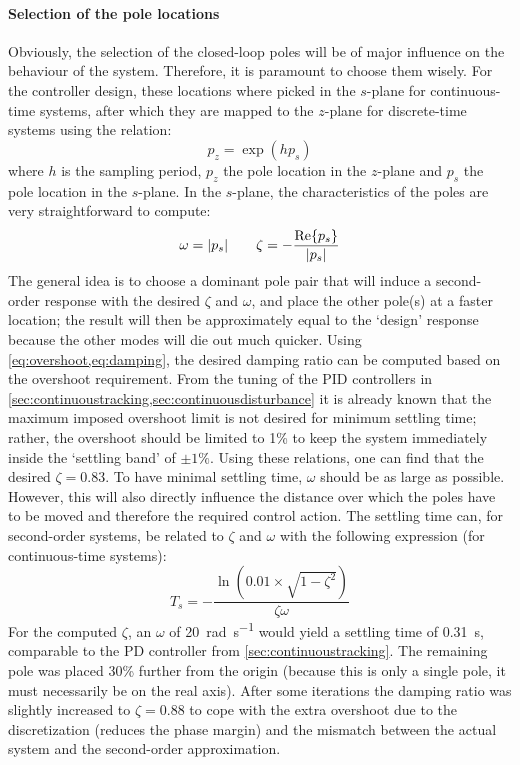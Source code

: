 \paragraph{Selection of the pole locations} Obviously, the selection of the closed-loop poles will be of major influence on the behaviour of the system. Therefore, it is paramount to choose them wisely. For the controller design, these locations where picked in the $s$-plane for continuous-time systems, after which they are mapped to the $z$-plane for discrete-time systems using the relation:
\begin{equation}
    p_z = \exp(h p_s) 
    \label{eq:polemapping}
\end{equation}
where $h$ is the sampling period, $p_z$ the pole location in the $z$-plane and $p_s$ the pole location in the $s$-plane. In the $s$-plane, the characteristics of the poles are very straightforward to compute:
$$ \omega = \abs{p_s} \qquad \zeta = -\frac{\Re{p_s}}{\abs{p_s}}$$
The general idea is to choose a dominant pole pair that will induce a second-order response with the desired $\zeta$ and $\omega$, and place the other pole(s) at a faster location; the result will then be approximately equal to the `design' response because the other modes will die out much quicker.
Using \cref{eq:overshoot,eq:damping}, the desired damping ratio can be computed based on the overshoot requirement. From the tuning of the PID controllers in \cref{sec:continuoustracking,sec:continuousdisturbance} it is already known that the maximum imposed overshoot limit is not desired for minimum settling time; rather, the overshoot should be limited to 1\% to keep the system immediately inside the `settling band' of $\pm 1\%$. Using these relations, one can find that the desired $\zeta = 0.83$. To have minimal settling time, $\omega$ should be as large as possible. However, this will also directly influence the distance over which the poles have to be moved and therefore the required control action. The settling time can, for second-order systems, be related to $\zeta$ and $\omega$ with the following expression (for continuous-time systems): \cite{nise}
$$ T_s = -\frac{\ln(0.01\times\sqrt{1 - \zeta^2})}{\zeta\omega}$$
For the computed $\zeta$, an $\omega$ of \SI{20}{\radian\per\second} would yield a settling time of \SI{0.31}{\second}, comparable to the PD controller from \cref{sec:continuoustracking}. The remaining pole was placed 30\% further from the origin (because this is only a single pole, it must necessarily be on the real axis). After some iterations the damping ratio was slightly increased to $\zeta = 0.88$ to cope with the extra overshoot due to the discretization (reduces the phase margin) and the mismatch between the actual system and the second-order approximation.
